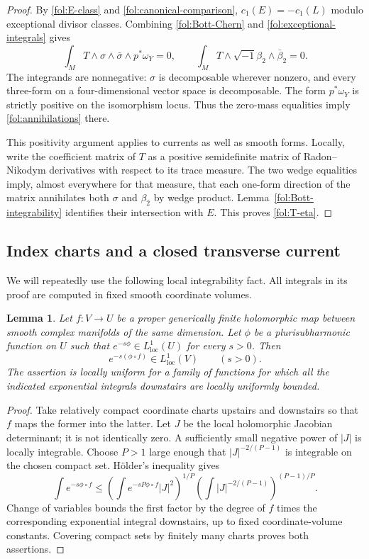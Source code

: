 \documentclass[11pt,letterpaper]{article}
\newcommand{\ii}{\sqrt{-1}}
\newtheorem{lemma}[theorem]{Lemma}
\theoremstyle{definition}
\theoremstyle{remark}
\begin{document}
\begin{proof}
By \eqref{fol:E-class} and \eqref{fol:canonical-comparison},
$c_1(E)=-c_1(L)$ modulo exceptional divisor classes.  Combining
\eqref{fol:Bott-Chern} and \eqref{fol:exceptional-integrals} gives
\[
 \int_M T\wedge\sigma\wedge\bar\sigma\wedge p^*\omega_Y=0,
 \qquad
 \int_M T\wedge\ii\beta_2\wedge\bar\beta_2=0.
\]
The integrands are nonnegative: $\sigma$ is decomposable wherever
nonzero, and every three-form on a four-dimensional vector space is
decomposable.  The form $p^*\omega_Y$ is strictly positive on the
isomorphism locus.  Thus the zero-mass equalities imply
\eqref{fol:annihilations} there.

This positivity argument applies to currents as well as smooth forms.
Locally, write the coefficient matrix of $T$ as a positive semidefinite
matrix of Radon--Nikodym derivatives with respect to its trace measure.
The two wedge equalities imply, almost everywhere for that measure, that
each one-form direction of the matrix annihilates both $\sigma$ and
$\beta_2$ by wedge product.  Lemma~\ref{fol:Bott-integrability} identifies
their intersection with $E$.  This proves \eqref{fol:T-eta}.
\end{proof}

\subsection{Index charts and a closed transverse current}

We will repeatedly use the following local integrability fact.  All
integrals in its proof are computed in fixed smooth coordinate volumes.

\begin{lemma}\label{fol:Jacobian-integrability}
Let $f\colon V\to U$ be a proper generically finite holomorphic map
between smooth complex manifolds of the same dimension.  Let $\phi$ be
a plurisubharmonic function on $U$ such that
$e^{-s\phi}\in L^1_{\mathrm{loc}}(U)$ for every $s>0$.  Then
\[
 e^{-s(\phi\circ f)}\in L^1_{\mathrm{loc}}(V)
 \qquad(s>0).
\]
The assertion is locally uniform for a family of functions for which
all the indicated exponential integrals downstairs are locally uniformly
bounded.
\end{lemma}

\begin{proof}
Take relatively compact coordinate charts upstairs and downstairs so that
$f$ maps the former into the latter.  Let $J$ be the local holomorphic
Jacobian determinant; it is not identically zero.  A sufficiently small
negative power of $|J|$ is locally integrable.  Choose $P>1$ large enough
that $|J|^{-2/(P-1)}$ is integrable on the chosen compact set.  H\"older's
inequality gives
\begin{equation}\label{fol:Jacobian-Holder}
 \int e^{-s\phi\circ f}
 \leq
 \left(\int e^{-sP\phi\circ f}|J|^2\right)^{1/P}
 \left(\int |J|^{-2/(P-1)}\right)^{(P-1)/P}.
\end{equation}
Change of variables bounds the first factor by the degree of $f$ times
the corresponding exponential integral downstairs, up to fixed
coordinate-volume constants.  Covering compact sets by finitely many
charts proves both assertions.
\end{proof}
\end{document}
